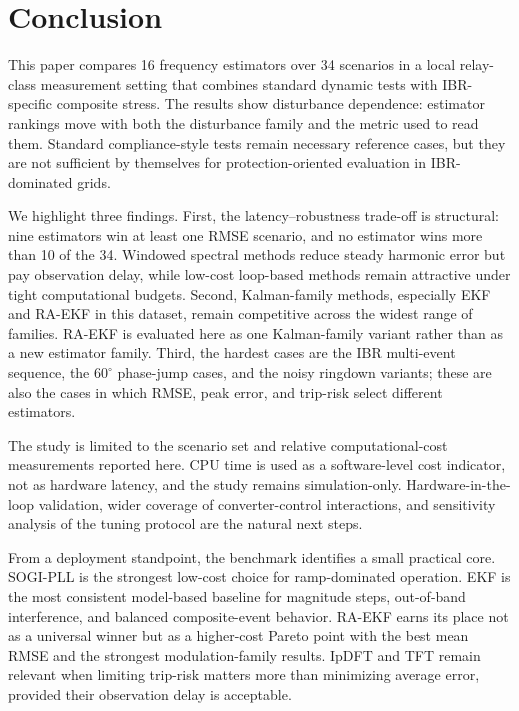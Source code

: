 \documentclass[conference,letterpaper]{IEEEtran}
\begin{document}
\section{Conclusion}
\label{sec:conclusion}

This paper compares 16 frequency estimators over 34 scenarios in a local
relay-class measurement setting that combines standard dynamic tests with
IBR-specific composite stress. The results show disturbance dependence:
estimator rankings move with both the disturbance family and the metric used to
read them. Standard compliance-style tests remain necessary reference cases,
but they are not sufficient by themselves for protection-oriented evaluation in
IBR-dominated grids.

We highlight three findings. First, the latency--robustness trade-off is
structural: nine estimators win at least one RMSE scenario, and no estimator
wins more than 10 of the 34. Windowed spectral methods reduce steady harmonic
error but pay observation delay, while low-cost loop-based methods remain
attractive under tight computational budgets. Second, Kalman-family methods,
especially EKF and RA-EKF in this dataset, remain competitive across the
widest range of families. RA-EKF is evaluated here as one Kalman-family
variant rather than as a new estimator family. Third, the hardest cases are
the IBR multi-event sequence, the $60^\circ$ phase-jump cases, and the noisy
ringdown variants; these are also the cases in which RMSE, peak error, and
trip-risk select different estimators.

The study is limited to the scenario set and relative computational-cost
measurements reported here. CPU time is used as a software-level cost indicator,
not as hardware latency, and the study remains simulation-only. Hardware-in-the-loop
validation, wider coverage of converter-control interactions, and sensitivity
analysis of the tuning protocol are the natural next steps.

From a deployment standpoint, the benchmark identifies a small practical core.
SOGI-PLL is the strongest low-cost choice for ramp-dominated operation. EKF is
the most consistent model-based baseline for magnitude steps, out-of-band
interference, and balanced composite-event behavior. RA-EKF earns its place not
as a universal winner but as a higher-cost Pareto point with the best mean RMSE
and the strongest modulation-family results. IpDFT and TFT remain relevant when
limiting trip-risk matters more than minimizing average error, provided their
observation delay is acceptable.
\end{document}
